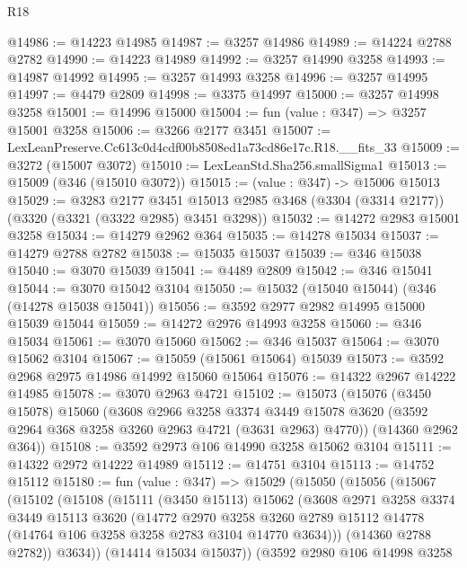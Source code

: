 \begin{lexlean}{R18}
\begin{coremodule}
@14986 := @14223 @14985
@14987 := @3257 @14986
@14989 := @14224 @2788 @2782
@14990 := @14223 @14989
@14992 := @3257 @14990 @3258
@14993 := @14987 @14992
@14995 := @3257 @14993 @3258
@14996 := @3257 @14995
@14997 := @4479 @2809
@14998 := @3375 @14997
@15000 := @3257 @14998 @3258
@15001 := @14996 @15000
@15004 := fun (value : @347) => @3257 @15001 @3258
@15006 := @3266 @2177 @3451
@15007 := LexLeanPreserve.Cc613c0d4cdf00b8508ed1a73cd86e17c.R18.__fits_33
@15009 := @3272 (@15007 @3072)
@15010 := LexLeanStd.Sha256.smallSigma1
@15013 := @15009 (@346 (@15010 @3072))
@15015 := (value : @347) -> @15006 @15013
@15029 := @3283
    @2177
    @3451
    @15013
    @2985
    @3468
    (@3304 (@3314 @2177))
    (@3320 (@3321 (@3322 @2985) @3451 @3298))
@15032 := @14272 @2983 @15001 @3258
@15034 := @14279 @2962 @364
@15035 := @14278 @15034
@15037 := @14279 @2788 @2782
@15038 := @15035 @15037
@15039 := @346 @15038
@15040 := @3070 @15039
@15041 := @4489 @2809
@15042 := @346 @15041
@15044 := @3070 @15042 @3104
@15050 := @15032 (@15040 @15044) (@346 (@14278 @15038 @15041))
@15056 := @3592 @2977 @2982 @14995 @15000 @15039 @15044
@15059 := @14272 @2976 @14993 @3258
@15060 := @346 @15034
@15061 := @3070 @15060
@15062 := @346 @15037
@15064 := @3070 @15062 @3104
@15067 := @15059 (@15061 @15064) @15039
@15073 := @3592 @2968 @2975 @14986 @14992 @15060 @15064
@15076 := @14322 @2967 @14222 @14985
@15078 := @3070 @2963 @4721
@15102 := @15073
    (@15076
      (@3450 @15078)
      @15060
      (@3608
        @2966
        @3258
        @3374
        @3449
        @15078
        @3620
        (@3592 @2964 @368 @3258 @3260 @2963 @4721 (@3631 @2963) @4770))
      (@14360 @2962 @364))
@15108 := @3592 @2973 @106 @14990 @3258 @15062 @3104
@15111 := @14322 @2972 @14222 @14989
@15112 := @14751 @3104
@15113 := @14752 @15112
@15180 := fun (value : @347) =>
  @15029
    (@15050
      (@15056
        (@15067
          (@15102
            (@15108
              (@15111
                (@3450 @15113)
                @15062
                (@3608
                  @2971
                  @3258
                  @3374
                  @3449
                  @15113
                  @3620
                  (@14772
                    @2970
                    @3258
                    @3260
                    @2789
                    @15112
                    @14778
                    (@14764 @106 @3258 @3258 @2783 @3104 @14770 @3634)))
                (@14360 @2788 @2782))
              @3634))
          (@14414 @15034 @15037))
        (@3592
          @2980
          @106
          @14998
          @3258

\end{coremodule}
\end{lexlean}
